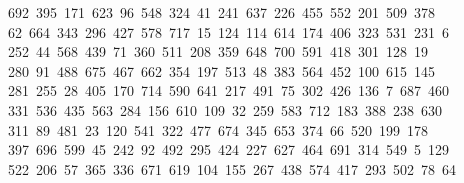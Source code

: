 \begin{tabbing}
\ 692\ 395\ 171\ 623\ 96\ 548\ 324\ 41\ 241\ 637\ 226\ 455\ 552\ 201\ 509\ 378\\[0pt]
\>\ 62\ 664\ 343\ 296\ 427\ 578\ 717\ 15\ 124\ 114\ 614\ 174\ 406\ 323\ 531\ 231\ 6\\[0pt]
\ 252\ 44\ 568\ 439\ 71\ 360\ 511\ 208\ 359\ 648\ 700\ 591\ 418\ 301\ 128\ 19\ \\[0pt]
\ 280\ 91\ 488\ 675\ 467\ 662\ 354\ 197\ 513\ 48\ 383\ 564\ 452\ 100\ 615\ 145\\[0pt]
\>\ 281\ 255\ 28\ 405\ 170\ 714\ 590\ 641\ 217\ 491\ 75\ 302\ 426\ 136\ 7\ 687\ 460\\[0pt]
\>\ 331\ 536\ 435\ 563\ 284\ 156\ 610\ 109\ 32\ 259\ 583\ 712\ 183\ 388\ 238\ 630\ \\[0pt]
\ 311\ 89\ 481\ 23\ 120\ 541\ 322\ 477\ 674\ 345\ 653\ 374\ 66\ 520\ 199\ 178\\[0pt]
\>\ 397\ 696\ 599\ 45\ 242\ 92\ 492\ 295\ 424\ 227\ 627\ 464\ 691\ 314\ 549\ 5\ 129\\[0pt]
\>\ 522\ 206\ 57\ 365\ 336\ 671\ 619\ 104\ 155\ 267\ 438\ 574\ 417\ 293\ 502\ 78\ 64\\[0pt]

\end{tabbing}
